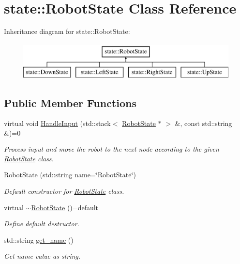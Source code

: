 \hypertarget{classstate_1_1_robot_state}{}\section{state\+::Robot\+State Class Reference}
\label{classstate_1_1_robot_state}
Inheritance diagram for state\+::Robot\+State\+:\begin{figure}[H]
\begin{center}
\leavevmode
\includegraphics[height=2.000000cm]{classstate_1_1_robot_state}
\end{center}
\end{figure}
\subsection*{Public Member Functions}
\begin{DoxyCompactItemize}
\item 
virtual void \mbox{\hyperlink{classstate_1_1_robot_state_a82c70d0b51eb4ddca9de1ca49ae29e3e}{Handle\+Input}} (std\+::stack$<$ \mbox{\hyperlink{classstate_1_1_robot_state}{Robot\+State}} $\ast$ $>$ \&, const std\+::string \&)=0
\begin{DoxyCompactList}\small\item\em Process input and move the robot to the next node according to the given \mbox{\hyperlink{classstate_1_1_robot_state}{Robot\+State}} class. \end{DoxyCompactList}\item 
\mbox{\hyperlink{classstate_1_1_robot_state_a7e7996ffa8c255402453c158a975ad5e}{Robot\+State}} (std\+::string name=\char`\"{}Robot\+State\char`\"{})
\begin{DoxyCompactList}\small\item\em Default constructor for \mbox{\hyperlink{classstate_1_1_robot_state}{Robot\+State}} class. \end{DoxyCompactList}\item 
\mbox{\label{classstate_1_1_robot_state_a31149246091b8513f41c94fcb13cd9b8}} 
virtual \mbox{\hyperlink{classstate_1_1_robot_state_a31149246091b8513f41c94fcb13cd9b8}{$\sim$\+Robot\+State}} ()=default
\begin{DoxyCompactList}\small\item\em Define default destructor. \end{DoxyCompactList}\item 
std\+::string \mbox{\hyperlink{classstate_1_1_robot_state_a27cf3f1f71159bf37f1ea7c0597837dc}{get\+\_\+name}} ()
\begin{DoxyCompactList}\small\item\em Get name value as string. \end{DoxyCompactList}\end{DoxyCompactItemize}


